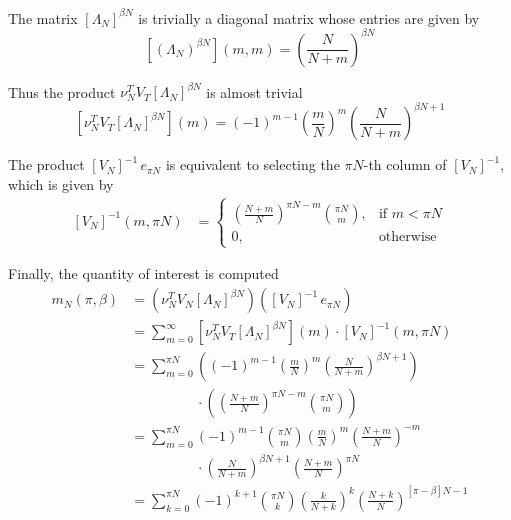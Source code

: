 \documentclass{article}
\newcommand{\ppar}[1]{\left( #1 \right)}
\newcommand{\spar}[1]{\left[ #1 \right]}
\begin{document}
The matrix $\spar{\Lambda_N}^{\beta N}$ is trivially a diagonal matrix whose entries are given by
\begin{equation}
    \spar{\ppar{\Lambda_N}^{\beta N}}(m,m)
    =
    \ppar{\frac{N}{N+m}}^{\beta N}
\end{equation}

Thus the product $\nu_N^T V_T \spar{\Lambda_N}^{\beta N}$ is almost trivial
\begin{equation}
    \spar{\nu_N^T V_T \spar{\Lambda_N}^{\beta N}}(m)
    =
    (-1)^{m-1} \ppar{\frac{m}{N}}^m
    \ppar{\frac{N}{N+m}}^{\beta N+1}
\end{equation}

The product $\spar{V_N}^{-1}\,e_{\pi N}$ is equivalent to selecting the $\pi N$-th column of $\spar{V_N}^{-1}$, which is given by
\begin{align}
\spar{V_N}^{-1}(m, \pi N)
    &=
    \begin{cases}
        \ppar{\frac{N+m}{N}}^{\pi N-m} \binom{\pi N}{m},
        &\text{if } m<\pi N \\
        0, &\text{otherwise}
    \end{cases}
\end{align}


Finally, the quantity of interest is computed
\begin{align*}
    m_N(\pi, \beta) 
    &=
    \ppar{\nu_N^T V_N \spar{\Lambda_N}^{\beta N}} \ppar{\spar{V_N}^{-1}\,e_{\pi N}}
    \\
    &=
    \sum_{m=0}^\infty 
    \spar{\nu_N^T V_T \spar{\Lambda_N}^{\beta N}}(m) \cdot
    \spar{V_N}^{-1}(m, \pi N)
    \\
    &=
    \sum_{m=0}^{\pi N}
    \ppar{(-1)^{m-1} \ppar{\frac{m}{N}}^m
    \ppar{\frac{N}{N+m}}^{\beta N+1}}
    \\
    &\phantom{=}
    \phantom{\sum_{m=0}^{\pi N}} \cdot
    \ppar{\ppar{\frac{N+m}{N}}^{\pi N-m} \binom{\pi N}{m}}
    \\
    &=
    \sum_{m=0}^{\pi N}
    (-1)^{m-1} \binom{\pi N}{m}
    \ppar{\frac{m}{N}}^m \ppar{\frac{N+m}{N}}^{-m}
    \\
    &\phantom{=}
    \phantom{\sum_{m=0}^{\pi N}} \cdot
    \ppar{\frac{N}{N+m}}^{\beta N+1}
    \ppar{\frac{N+m}{N}}^{\pi N}
    \\
    &=
    \sum_{k=0}^{\pi N}
    (-1)^{k+1} 
    \binom{\pi N}{k}
    \ppar{\frac{k}{N+k}}^k
    \ppar{\frac{N+k}{N}}^{\spar{\pi-\beta} N -1}
\end{align*}
\end{document}
